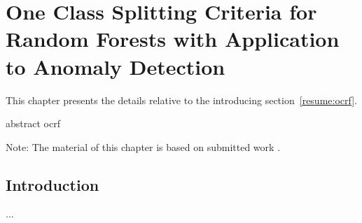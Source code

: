 \chapter{One Class Splitting Criteria for Random Forests with Application to Anomaly Detection}
\label{chap:ocrf}
\begin{chapabstract}
This chapter presents the details relative to the introducing section~\ref{resume:ocrf}.

abstract ocrf
\end{chapabstract}
Note: The material of this chapter is based on submitted work \citep{OCRF16}.




\section{Introduction}
...